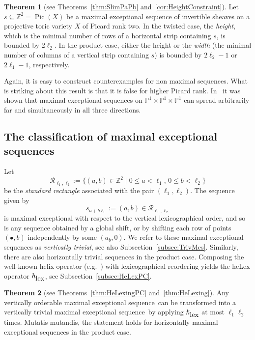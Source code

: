 \documentclass[11pt]{article}
\theoremstyle{definition}
\numberwithin{equation}{section}
\newcommand{\PP}{\mathbb P}
\newcommand{\Z}{\mathbb Z}
\newcommand{\CR}{{\mathcal R}}
\newcommand{\Pic}{\operatorname{Pic}}
\newcommand{\kss}{\scriptscriptstyle}
\newcommand{\kbb}{{\kss \bullet}}
\newcommand{\cl}{s}
\newcommand{\Rect}{\CR}
\newcommand{\mes}{maximal exceptional sequence}
\newcommand{\helix}{\hslash}
\newcommand{\heLex}{\helix_{\mbox{\tiny lex}}}
\newtheorem{main}{Theorem}
\begin{document}
  \begin{main} [{see Theorems~\ref{thm:SlimPaPb} and~\ref{cor:HeightConstraint}}] \label{thm:introB}
Let $\cl\subseteq\Z^2=\Pic(X)$ be a 
maximal exceptional sequence of invertible 
sheaves on a projective toric variety $X$ 
of Picard rank two. In the twisted case, 
the {\em height}, which is the minimal number of rows 
of a horizontal strip containing $\cl$, is bounded by 
$2\ell_2$. In the product case, either the height or 
the {\em width} (the minimal number of columns of a 
vertical strip containing $\cl$) is bounded by $2\ell_2-1$ 
or $2\ell_1-1$, respectively.
 \end{main}

Again, it is easy to construct counterexamples 
for non maximal sequences. What is striking 
about this result is that it is false for higher 
Picard rank. In~\cite[Example~3.4]{p1p1p1} 
it was shown that maximal exceptional sequences 
on $\PP^1\times\PP^1\times\PP^1$ can spread 
arbitrarily far and simultaneously in all 
three directions.

\subsection{The classification of {\mes}s}
\label{subsubsec:HeLexing}
{Let
$$
\Rect_{\ell_1,\ell_2}:=\{(a,b)\in\Z^2\mid 
0\leq a<\ell_1,\,0\leq b<\ell_2\}
$$
be the {\em standard rectangle} associated 
with the pair $(\ell_1,\ell_2)$. 
The sequence given by
$$
\cl_{a+b\ell_1}:=(a,b)\in\Rect_{\ell_1,\ell_2}
$$
is maximal exceptional with respect to the vertical 
lexicographical order, and so is any sequence obtained 
by a global shift, or by shifting 
{each row of points $(\kbb,b)$ independently by some $(a_b,0)$.}
We refer to these \mes s as 
{\em vertically trivial}, see also 
Subsection~\ref{subsec:TrivMes}. Similarly, 
there are also horizontally trivial sequences in the 
product case. Composing the well-known helix operator 
(e.g.~\cite{rudakov}) with lexicographical reordering 
yields the heLex operator {$\heLex$}, see 
Subsection~\ref{subsec:HeLexPC}.}

\begin{main} [{see Theorems~\ref{thm:HeLexingPC} and~\ref{thm:HeLexing}}] \label{thm:introC}
Any vertically orderable \mes\ can be transformed 
into a vertically trivial \mes\ by applying $\heLex$ 
at most $\ell_1\ell_2$ times. Mutatis mutandis, the 
statement holds for horizontally \mes s in the 
product case.
 \end{main}
\end{document}

